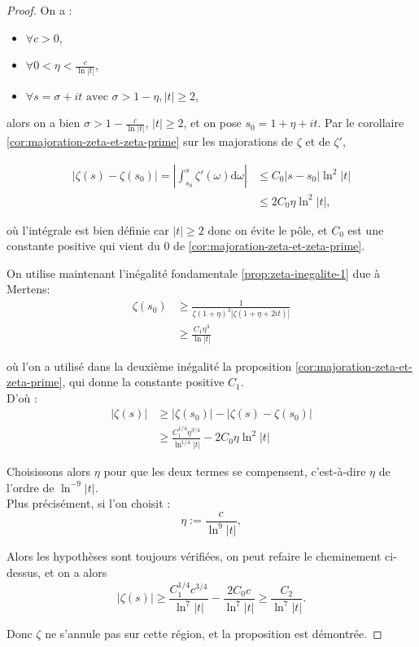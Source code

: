 \documentclass[french]{report}
\begin{document}
\begin{proof} On a :
  \begin{itemize}
    \item $\forall c>0$,
    \item $\forall 0<\eta<\frac{c}{\ln|t|}$,
    \item $\forall s=\sigma+it\,\,\mathrm{avec}\,\,\sigma>1-\eta, |t|\geq2$,
  \end{itemize}
  alors on a bien $\sigma > 1-\frac{c}{\ln|t|}$, $|t|\geq2$, et on pose $s_0=1+\eta+it$. Par le corollaire \ref{cor:majoration-zeta-et-zeta-prime} sur les majorations de $\zeta$ et de $\zeta'$,

  \begin{align*}
    |\zeta(s)-\zeta(s_0)|
    = \left|\int_{s_0}^s\zeta'(\omega)\mathrm{d}\omega\right|
    &\leq C_0|s-s_0|\ln^2|t| \\
    &\leq 2C_0\eta\ln^2|t|,
  \end{align*}
  
  où l'intégrale est bien définie car $|t|\geq2$ donc on évite le pôle, et $C_0$ est une constante positive qui vient du $0$ de \ref{cor:majoration-zeta-et-zeta-prime}.

  On utilise maintenant l'inégalité fondamentale \ref{prop:zeta-inegalite-1} due à Mertens:
  \begin{align*}
    \zeta(s_0)
    &\geq \frac{1}{\zeta(1+\eta)^3|\zeta(1+\eta+2it)|} \\
    &\geq \frac{C_1\eta^3}{\ln|t|}
  \end{align*}

  où l'on a utilisé dans la deuxième inégalité la proposition \ref{cor:majoration-zeta-et-zeta-prime}, qui donne la constante positive $C_1$.
  \\

  D'où :
  \begin{align*}
    |\zeta(s)|
    &\geq |\zeta(s_0)| - |\zeta(s)-\zeta(s_0)| \\
    &\geq \frac{C_1^{1/4}\eta^{3/4}}{\ln^{1/4}|t|} - 2C_0\eta\ln^2|t|
  \end{align*}

  Choisissons alors $\eta$ pour que les deux termes se compensent, c'est-à-dire $\eta$ de l'ordre de $\ln^{-9}|t|$.
  \\

  Plus précisément, si l'on choisit :
  \[ \eta:=\frac{c}{\ln^9|t|}, \]

  Alors les hypothèses sont toujours vérifiées, on peut refaire le cheminement ci-dessus, et on a alors
  \[
    |\zeta(s)|
    \geq\frac{C_1^{1/4}c^{3/4}}{\ln^7|t|}-\frac{2C_0c}{\ln^7|t|}
    \geq\frac{C_2}{\ln^7|t|}.
  \]

  Donc $\zeta$ ne s'annule pas sur cette région, et la proposition est démontrée.
\end{proof}
\end{document}

